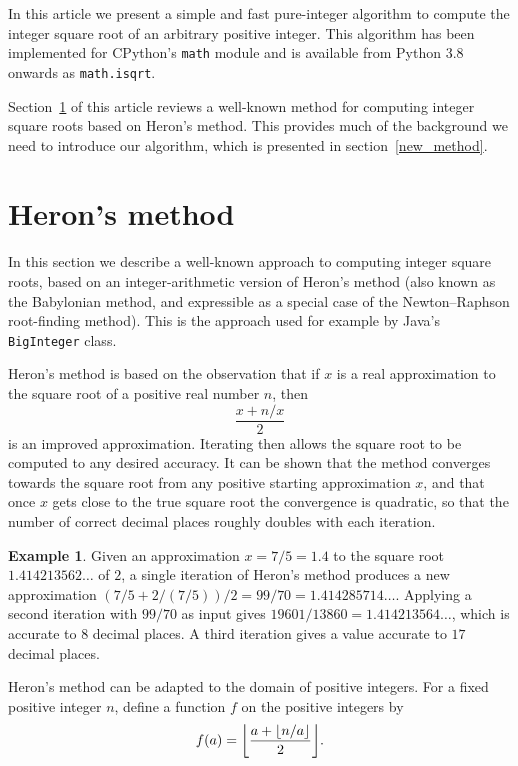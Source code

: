 \documentclass[a4paper]{article}
\DeclarePairedDelimiter\floor{\lfloor}{\rfloor}
\theoremstyle{plain}
\theoremstyle{definition}
\newtheorem{example}[theorem]{Example}
\begin{document}
In this article we present a simple and fast pure-integer algorithm to compute
the integer square root of an arbitrary positive integer. This algorithm has
been implemented for CPython's \lstinline{math} module and is available from
Python 3.8 onwards as \lstinline{math.isqrt}.

Section~\ref{old_method} of this article reviews a well-known method for
computing integer square roots based on Heron's method. This provides much of
the background we need to introduce our algorithm, which is presented in
section~\ref{new_method}.

\section{Heron's method}
\label{old_method}

In this section we describe a well-known approach to computing integer square
roots, based on an integer-arithmetic version of Heron's method (also known
as the Babylonian method, and expressible as a special case of the
Newton--Raphson root-finding method). This is the approach
used for example by Java's \lstinline$BigInteger$ class.

Heron's method is based on the observation that if $x$ is a real approximation
to the square root of a positive real number $n$, then
$$\frac{x + n/x}2$$ is an improved approximation. Iterating then allows the
square root to be computed to any desired accuracy. It can be shown that the
method converges towards the square root from any positive starting
approximation $x$, and that once $x$ gets close to the true square root the
convergence is quadratic, so that the number of correct decimal places roughly
doubles with each iteration.

\begin{example}
  Given an approximation $x = 7/5 = 1.4$ to the square root $1.414213562\dots$
  of $2$, a single iteration of Heron's method produces a new approximation
  $(7/5 + 2/(7/5))/2 = 99/70 = 1.414285714\dots$. Applying a second iteration
  with $99/70$ as input gives $19601/13860 = 1.414213564\dots$, which is
  accurate to $8$ decimal places. A third iteration gives a value accurate to
  $17$ decimal places.
\end{example}

Heron's method can be adapted to the domain of positive integers. For a fixed
positive integer $n$, define a function $f$ on the positive integers by
$$f(a) = \floor*{\frac{a + \floor{n/a}}2}.$$
\end{document}

